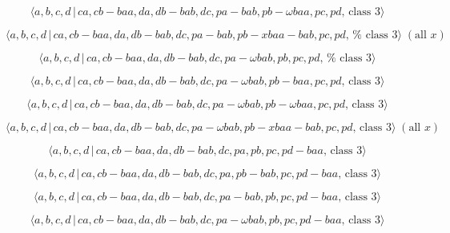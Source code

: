 \documentclass[10pt]{article}
\begin{document}
\begin{equation}
\langle a,b,c,d\,|\,ca,cb-baa,da,db-bab,dc,pa-bab,pb-\omega baa,pc,pd,\,%
\text{class }3\rangle  \tag{7.3404}
\end{equation}

\begin{equation}
\langle a,b,c,d\,|\,ca,cb-baa,da,db-bab,dc,pa-bab,pb-xbaa-bab,pc,pd,\,\text{%
class }3\rangle \;(\text{all }x)  \tag{7.3405}
\end{equation}

\begin{equation}
\langle a,b,c,d\,|\,ca,cb-baa,da,db-bab,dc,pa-\omega bab,pb,pc,pd,\,\text{%
class }3\rangle  \tag{7.3406}
\end{equation}

\begin{equation}
\langle a,b,c,d\,|\,ca,cb-baa,da,db-bab,dc,pa-\omega bab,pb-baa,pc,pd,\,%
\text{class }3\rangle  \tag{7.3407}
\end{equation}

\begin{equation}
\langle a,b,c,d\,|\,ca,cb-baa,da,db-bab,dc,pa-\omega bab,pb-\omega
baa,pc,pd,\,\text{class }3\rangle  \tag{7.3408}
\end{equation}

\begin{equation}
\langle a,b,c,d\,|\,ca,cb-baa,da,db-bab,dc,pa-\omega bab,pb-xbaa-bab,pc,pd,\,%
\text{class }3\rangle \;(\text{all }x)  \tag{7.3409}
\end{equation}

\begin{equation}
\langle a,b,c,d\,|\,ca,cb-baa,da,db-bab,dc,pa,pb,pc,pd-baa,\,\text{class }%
3\rangle  \tag{7.3410}
\end{equation}

\begin{equation}
\langle a,b,c,d\,|\,ca,cb-baa,da,db-bab,dc,pa,pb-bab,pc,pd-baa,\,\text{class 
}3\rangle  \tag{7.3411}
\end{equation}

\begin{equation}
\langle a,b,c,d\,|\,ca,cb-baa,da,db-bab,dc,pa-bab,pb,pc,pd-baa,\,\text{class 
}3\rangle  \tag{7.3412}
\end{equation}

\begin{equation}
\langle a,b,c,d\,|\,ca,cb-baa,da,db-bab,dc,pa-\omega bab,pb,pc,pd-baa,\,%
\text{class }3\rangle  \tag{7.3413}
\end{equation}
\end{document}
